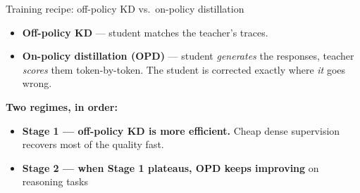 \documentclass[9pt]{beamer}
\begin{document}
	\begin{frame}{Training recipe: off-policy KD vs.\ on-policy distillation}
		
		\begin{itemize}
			\item \textbf{Off-policy KD} --- student matches the teacher's traces. 
			\item \textbf{On-policy distillation (OPD)} --- student \emph{generates} the
			responses, teacher \emph{scores} them token-by-token. The student is
			corrected exactly where \emph{it} goes wrong.
		\end{itemize}
		
		\vspace{1em}
		\begin{mdframed}
			\textbf{Two regimes, in order:}
			\begin{itemize}
				\item \textbf{Stage 1 --- off-policy KD is more efficient.} Cheap dense
				supervision recovers most of the quality fast.
				\item \textbf{Stage 2 --- when Stage 1 plateaus, OPD keeps improving} on
				reasoning tasks
			\end{itemize}
		\end{mdframed}
		
	\end{frame}
	
\end{document}
